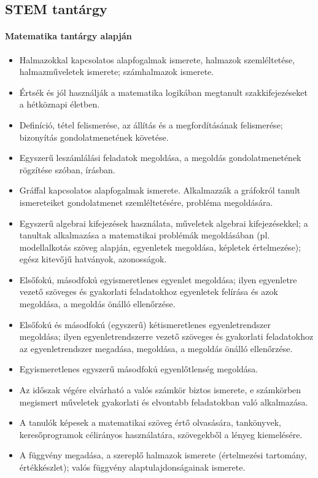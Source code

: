 \subsection{STEM tantárgy}
\paragraph{Matematika tantárgy alapján}
\begin{itemize}
\item Halmazokkal kapcsolatos alapfogalmak ismerete, halmazok szemléltetése, halmazműveletek ismerete; számhalmazok ismerete.
\item Értsék és jól használják a matematika logikában megtanult szakkifejezéseket a hétköznapi életben.
\item Definíció, tétel felismerése, az állítás és a megfordításának felismerése; bizonyítás gondolatmenetének követése.
\item Egyszerű leszámlálási feladatok megoldása, a megoldás gondolatmenetének rögzítése szóban, írásban.
\item Gráffal kapcsolatos alapfogalmak ismerete. Alkalmazzák a gráfokról tanult ismereteiket gondolatmenet szemléltetésére, probléma megoldására.
\item Egyszerű algebrai kifejezések használata, műveletek algebrai kifejezésekkel; a tanultak alkalmazása a matematikai problémák megoldásában (pl. modellalkotás szöveg alapján, egyenletek megoldása, képletek értelmezése); egész kitevőjű hatványok, azonosságok.
\item Elsőfokú, másodfokú egyismeretlenes egyenlet megoldása; ilyen egyenletre vezető szöveges és gyakorlati feladatokhoz egyenletek felírása és azok megoldása, a megoldás önálló ellenőrzése.
\item Elsőfokú és másodfokú (egyszerű) kétismeretlenes egyenletrendszer megoldása; ilyen egyenletrendszerre vezető szöveges és gyakorlati feladatokhoz az egyenletrendszer megadása, megoldása, a megoldás önálló ellenőrzése.
\item Egyismeretlenes egyszerű másodfokú egyenlőtlenség megoldása.
\item Az időszak végére elvárható a valós számkör biztos ismerete, e számkörben megismert műveletek gyakorlati és elvontabb feladatokban való alkalmazása.
\item A tanulók képesek a matematikai szöveg értő olvasására, tankönyvek, keresőprogramok célirányos használatára, szövegekből a lényeg kiemelésére.
\item A függvény megadása, a szereplő halmazok ismerete (értelmezési tartomány, értékkészlet); valós függvény alaptulajdonságainak ismerete.

\end{itemize}
